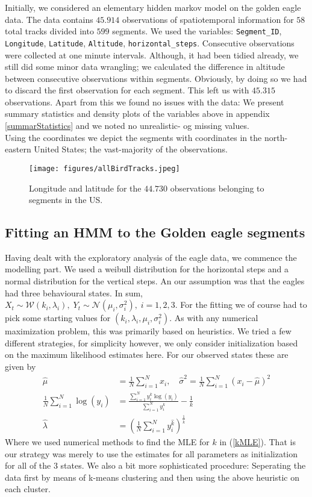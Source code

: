 Initially, we considered an elementary hidden markov model on the golden eagle data.\cite{eagleData} The data contains $45.914$ observations of spatiotemporal information for $58$ total tracks divided into $599$ segments. We used the variables: \texttt{Segment\_ID}, \texttt{Longitude}, \texttt{Latitude}, \texttt{Altitude}, \texttt{horizontal\_steps}. Consecutive observations were collected at one minute intervals. Although, it had been tidied already, we still did some minor data wrangling; we calculated the difference in altitude between consecutive observations within segments. Obviously, by doing so we had to discard the first observation for each segment. This left us with $45.315$ observations. Apart from this we found no issues with the data: We present summary statistics and density plots of the variables above in appendix \ref{summarStatistics} and we noted no unrealistic- og missing values.\\ Using the coordinates we depict the segments with coordinates in the north-eastern United States; the vast-majority of the observations.
\begin{figure}[h]
    \begin{center}
        \texttt{[image: figures/allBirdTracks.jpeg]}
        \caption{Longitude and latitude for the $44.730$ observations belonging to segments in the US.}
    \end{center}
\end{figure}
\subsection{Fitting an HMM to the Golden eagle segments}\label{hmmGoldenEagle}
Having dealt with the exploratory analysis of the eagle data, we commence the modelling part. We used a weibull distribution for the horizontal steps and a normal distribution for the vertical steps. An our assumption was that the eagles had three behavioural states. In sum, $X_t \sim \mathcal{W}(k_i, \lambda_i), \; Y_t \sim \mathcal{N}(\mu_i, \sigma_i^2), \; i = 1,2,3$. For the fitting we of course  had to pick some starting values for $(k_i, \lambda_i, \mu_i, \sigma_i^2)$. As with any numerical maximization problem, this was primarily based on heuristics. We tried a few different strategies, for simplicity however, we only consider initialization based on the maximum likelihood estimates here. For our observed states these are given by\cite{Cohen1965}
\begin{align}
    \hat{\mu} &= \frac{1}{N}\sum_{i = 1}^N x_i, \quad \hat{\sigma}^2 = \frac{1}{N}\sum_{i = 1}^N \left(x_i-\hat{\mu}\right)^2\\
    \frac{1}{N}\sum_{i = 1}^N \log(y_i)&= \frac{\sum_{i = 1}^N y_i^k\log(y_i)}{\sum_{i = 1}^N y_i^k} - \frac{1}{k} \label{kMLE} \\  \hat{\lambda} &= \left(\frac{1}{N} \sum_{i = 1}^N y_i^{\hat{k}}\right)^{\frac{1}{\hat{k}}}
\end{align}
Where we used numerical methods to find the MLE for $k$ in (\ref{kMLE}). That is our strategy was merely to use the estimates for all parameters as initialization for all of the $3$ states. We also a bit more sophisticated procedure: Seperating the data first by means of k-means clustering \cite{RLang} and then using the above heuristic on each cluster.
